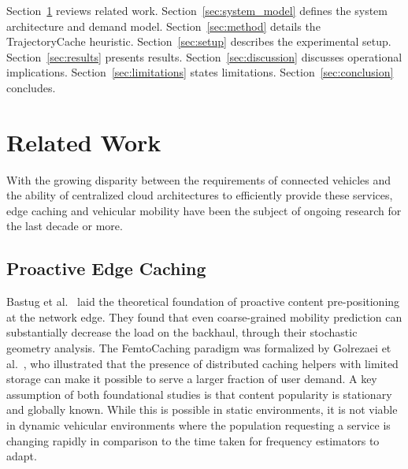\documentclass[preprint,12pt]{elsarticle}
\begin{document}
	Section~\ref{sec:related} reviews related work. Section~\ref{sec:system_model} defines the system architecture and demand model. Section~\ref{sec:method} details the TrajectoryCache heuristic. Section~\ref{sec:setup} describes the experimental setup. Section~\ref{sec:results} presents results. Section~\ref{sec:discussion} discusses operational implications. Section~\ref{sec:limitations} states limitations. Section~\ref{sec:conclusion} concludes.

	\section{Related Work}

	\label{sec:related}
	
	With the growing disparity between the requirements of connected vehicles and the ability of centralized cloud architectures to efficiently provide these services, edge caching and vehicular mobility have been the subject of ongoing research for the last decade or more.
	
	\subsection{Proactive Edge Caching}
	Bastug et al.~\cite{bastug2014living} laid the theoretical foundation of proactive content pre-positioning at the network edge. They found that even coarse-grained mobility prediction can substantially decrease the load on the backhaul, through their stochastic geometry analysis. The FemtoCaching paradigm was formalized by Golrezaei et al.~\cite{golrezaei2012femtocaching}, who illustrated that the presence of distributed caching helpers with limited storage can make it possible to serve a larger fraction of user demand. A key assumption of both foundational studies is that content popularity is stationary and globally known. While this is possible in static environments, it is not viable in dynamic vehicular environments where the population requesting a service is changing rapidly in comparison to the time taken for frequency estimators to adapt.
	
\end{document}
